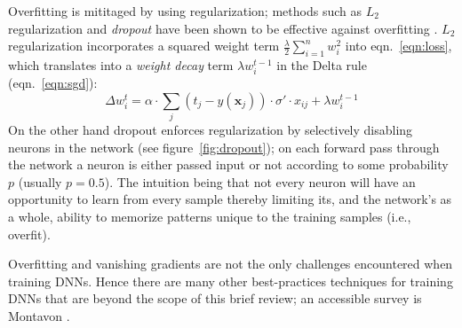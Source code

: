 Overfitting is mititaged by using regularization; methods such as \(L_2\) regularization and \textit{dropout} have been shown to be effective against overfitting \cite{bengio2013}.
%
\(L_2\) regularization incorporates a squared weight term \(\frac{\lambda}{2}\sum_{i=1}^n w_i^2\) into eqn.~\eqref{eqn:loss}, which translates into a \textit{weight decay} term \(\lambda w_i^{t-1}\) in the Delta rule (eqn.~\eqref{eqn:sgd}):
\begin{equation}
    \Delta w_i^t = \alpha \cdot \sum_j (t_j-y(\mathbf{x}_j))\cdot \sigma'\cdot x_{ij} + \lambda w_i^{t-1}
    \label{eqn:weightdecaydelta}
\end{equation}
On the other hand dropout enforces regularization by selectively disabling neurons in the network (see figure~\ref{fig:dropout}); on each forward pass through the network a neuron is either passed input or not according to some probability \(p\) (usually \(p = 0.5\)).
%
The intuition being that not every neuron will have an opportunity to learn from every sample thereby limiting its, and the network's as a whole, ability to memorize patterns unique to the training samples (i.e., overfit).

Overfitting and vanishing gradients are not the only challenges encountered when training DNNs.
%
Hence there are many other best-practices techniques for training DNNs that are beyond the scope of this brief review; an accessible survey is Montavon \etal \cite{montavon2012neural}.
